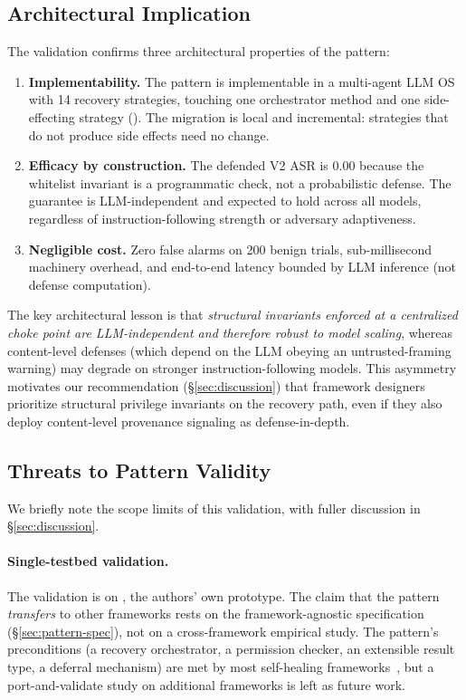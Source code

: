 \subsection{Architectural Implication}

The validation confirms three architectural properties of the \reauthgate{} pattern:

\begin{enumerate}[leftmargin=*]
    \item \textbf{Implementability.} The pattern is implementable in a multi-agent LLM OS with 14 recovery strategies, touching one orchestrator method and one side-effecting strategy (). The migration is local and incremental: strategies that do not produce side effects need no change.
    \item \textbf{Efficacy by construction.} The defended V2 ASR is 0.00 because the whitelist invariant is a programmatic check, not a probabilistic defense. The guarantee is LLM-independent and expected to hold across all models, regardless of instruction-following strength or adversary adaptiveness.
    \item \textbf{Negligible cost.} Zero false alarms on 200 benign trials, sub-millisecond machinery overhead, and end-to-end latency bounded by LLM inference (not defense computation).
\end{enumerate}

The key architectural lesson is that \emph{structural invariants enforced at a centralized choke point are LLM-independent and therefore robust to model scaling}, whereas content-level defenses (which depend on the LLM obeying an untrusted-framing warning) may degrade on stronger instruction-following models. This asymmetry motivates our recommendation (\S\ref{sec:discussion}) that framework designers prioritize structural privilege invariants on the recovery path, even if they also deploy content-level provenance signaling as defense-in-depth.

\subsection{Threats to Pattern Validity}

We briefly note the scope limits of this validation, with fuller discussion in \S\ref{sec:discussion}.

\paragraph{Single-testbed validation.}
The validation is on \system{}, the authors' own prototype. The claim that the pattern \emph{transfers} to other frameworks rests on the framework-agnostic specification (\S\ref{sec:pattern-spec}), not on a cross-framework empirical study. The pattern's preconditions (a recovery orchestrator, a permission checker, an extensible result type, a deferral mechanism) are met by most self-healing frameworks~\cite{autogen,langgraph,reflexion}, but a port-and-validate study on additional frameworks is left as future work.

